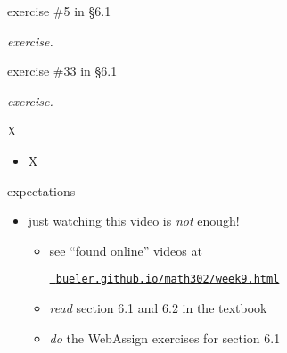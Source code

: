 \documentclass[urlcolor=blue,dvipsnames]{beamer}
\begin{document}
\begin{frame}{exercise \#5 in \S 6.1}

\noindent \emph{exercise.}  

\vspace{60mm}
\end{frame}


\begin{frame}{exercise \#33 in \S 6.1}

\noindent \emph{exercise.}  

\vspace{60mm}
\end{frame}


\begin{frame}{X}

\begin{itemize}
\item X
\end{itemize}
\end{frame}


\begin{frame}{expectations}

\begin{itemize}
\item just watching this video is \emph{not} enough!
     \begin{itemize}
     \item see ``found online'' videos at

     \centerline{\href{https://bueler.github.io/math302/week9.html}{\tt \color{cyan} bueler.github.io/math302/week9.html}}
     \item \emph{read} section 6.1 and 6.2 in the textbook
     \item \emph{do} the WebAssign exercises for section 6.1
     \end{itemize}
\end{itemize}
\end{frame}
\end{document}
